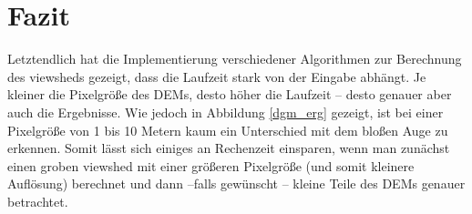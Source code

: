 \section{Fazit}

Letztendlich hat die Implementierung verschiedener Algorithmen zur Berechnung des viewsheds gezeigt, dass die Laufzeit stark von der 
Eingabe abhängt. Je kleiner die Pixelgröße des DEMs, desto höher die Laufzeit -- desto genauer aber auch die Ergebnisse. Wie jedoch in Abbildung 
\ref{dgm_erg} gezeigt, ist bei einer Pixelgröße von 1 bis 10 Metern kaum ein Unterschied mit dem bloßen Auge zu erkennen. Somit lässt sich einiges
an Rechenzeit einsparen, wenn man zunächst einen groben viewshed mit einer größeren Pixelgröße (und somit kleinere Auflösung) berechnet und dann --falls
gewünscht -- kleine Teile des DEMs genauer betrachtet. 